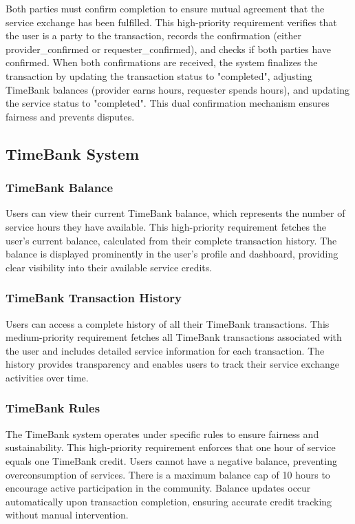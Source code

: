 \documentclass[12pt,a4paper]{report}
\begin{document}
Both parties must confirm completion to ensure mutual agreement that the service exchange has been fulfilled. This high-priority requirement verifies that the user is a party to the transaction, records the confirmation (either provider\_confirmed or requester\_confirmed), and checks if both parties have confirmed. When both confirmations are received, the system finalizes the transaction by updating the transaction status to "completed", adjusting TimeBank balances (provider earns hours, requester spends hours), and updating the service status to "completed". This dual confirmation mechanism ensures fairness and prevents disputes.

\subsection{TimeBank System}

\subsubsection{TimeBank Balance}

Users can view their current TimeBank balance, which represents the number of service hours they have available. This high-priority requirement fetches the user's current balance, calculated from their complete transaction history. The balance is displayed prominently in the user's profile and dashboard, providing clear visibility into their available service credits.

\subsubsection{TimeBank Transaction History}

Users can access a complete history of all their TimeBank transactions. This medium-priority requirement fetches all TimeBank transactions associated with the user and includes detailed service information for each transaction. The history provides transparency and enables users to track their service exchange activities over time.

\subsubsection{TimeBank Rules}

The TimeBank system operates under specific rules to ensure fairness and sustainability. This high-priority requirement enforces that one hour of service equals one TimeBank credit. Users cannot have a negative balance, preventing overconsumption of services. There is a maximum balance cap of 10 hours to encourage active participation in the community. Balance updates occur automatically upon transaction completion, ensuring accurate credit tracking without manual intervention.
\end{document}
